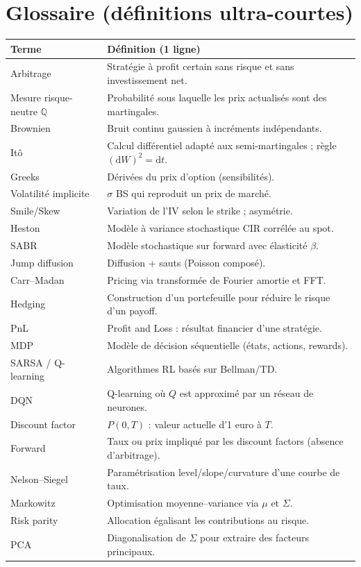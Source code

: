 \documentclass[11pt,a4paper]{report}
\newcommand{\dd}{\mathrm{d}}
\newcommand{\Q}{\mathbb{Q}}
\newcommand{\1}{\mathbbm{1}}
\theoremstyle{definition}
\theoremstyle{plain}
\theoremstyle{remark}
\begin{document}
\section{Glossaire (définitions ultra-courtes)}
\begin{longtable}{@{}p{3.2cm}p{11cm}@{}}
\toprule
Terme & Définition (1 ligne) \\
\midrule
Arbitrage & Stratégie à profit certain sans risque et sans investissement net. \\
Mesure risque-neutre $\Q$ & Probabilité sous laquelle les prix actualisés sont des martingales. \\
Brownien & Bruit continu gaussien à incréments indépendants. \\
Itô & Calcul différentiel adapté aux semi-martingales ; règle $(\dd W)^2=\dd t$. \\
Greeks & Dérivées du prix d'option (sensibilités). \\
Volatilité implicite & $\sigma$ BS qui reproduit un prix de marché. \\
Smile/Skew & Variation de l'IV selon le strike ; asymétrie. \\
Heston & Modèle à variance stochastique CIR corrélée au spot. \\
SABR & Modèle stochastique sur forward avec élasticité $\beta$. \\
Jump diffusion & Diffusion + sauts (Poisson composé). \\
Carr--Madan & Pricing via transformée de Fourier amortie et FFT. \\
Hedging & Construction d'un portefeuille pour réduire le risque d'un payoff. \\
PnL & Profit and Loss : résultat financier d'une stratégie. \\
MDP & Modèle de décision séquentielle (états, actions, rewards). \\
SARSA / Q-learning & Algorithmes RL basés sur Bellman/TD. \\
DQN & Q-learning où $Q$ est approximé par un réseau de neurones. \\
Discount factor & $P(0,T)$ : valeur actuelle d'1 euro à $T$. \\
Forward & Taux ou prix impliqué par les discount factors (absence d'arbitrage). \\
Nelson--Siegel & Paramétrisation level/slope/curvature d'une courbe de taux. \\
Markowitz & Optimisation moyenne--variance via $\mu$ et $\Sigma$. \\
Risk parity & Allocation égalisant les contributions au risque. \\
PCA & Diagonalisation de $\Sigma$ pour extraire des facteurs principaux. \\
\bottomrule
\end{longtable}
\end{document}
